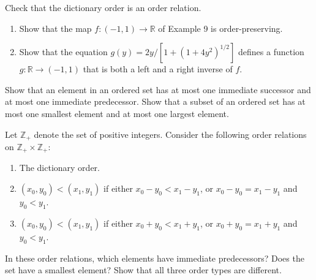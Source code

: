   \begin{exercise}[Munkres 3.9]
    Check that the dictionary order is an order relation.
  \end{exercise}
  \begin{solution}
    
  \end{solution}

  \begin{exercise}[Munkres 3.10]
    \begin{enumerate}
      \item Show that the map $f: (-1, 1) \to \mathbb{R}$ of Example 9 is order-preserving.
      \item Show that the equation $g(y) = 2y/[1 + (1 + 4y^2)^{1/2}]$ defines a function $g: \mathbb{R} \to (-1, 1)$ that is both a left and a right inverse of $f$.
    \end{enumerate}
  \end{exercise}
  \begin{solution}
    
  \end{solution}

  \begin{exercise}[Munkres 3.11]
    Show that an element in an ordered set has at most one immediate successor and at most one immediate predecessor. Show that a subset of an ordered set has at most one smallest element and at most one largest element.
  \end{exercise}
  \begin{solution}
    
  \end{solution}

  \begin{exercise}[Munkres 3.12]
    Let $\mathbb{Z}_+$ denote the set of positive integers. Consider the following order relations on $\mathbb{Z}_+ \times \mathbb{Z}_+$:
    \begin{enumerate}
      \item The dictionary order.
      \item $(x_0, y_0) < (x_1, y_1)$ if either $x_0 - y_0 < x_1 - y_1$, or $x_0 - y_0 = x_1 - y_1$ and $y_0 < y_1$.
      \item $(x_0, y_0) < (x_1, y_1)$ if either $x_0 + y_0 < x_1 + y_1$, or $x_0 + y_0 = x_1 + y_1$ and $y_0 < y_1$.
    \end{enumerate}
    In these order relations, which elements have immediate predecessors? Does the set have a smallest element? Show that all three order types are different.
  \end{exercise}
  \begin{solution}
    
  \end{solution}

